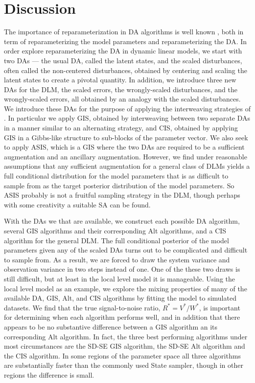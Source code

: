 \documentclass[12pt]{article}
\begin{document}
\section{Discussion}\label{sec:Discuss}

The importance of reparameterization in DA algorithms is well known \citep{papaspiliopoulos2007general}, both in term of reparameterizing the model parameters and reparameterizing the DA. In order explore reparameterizing the DA in dynamic linear models, we start with two DAs --- the usual DA, called the latent states, and the scaled disturbances, often called the non-centered disturbances, obtained by centering and scaling the latent states to create a pivotal quantity. In addition, we introduce three new DAs for the DLM, the scaled errors, the wrongly-scaled disturbances, and the wrongly-scaled errors, all obtained by an analogy with the scaled disturbances. We introduce these DAs for the purpose of applying the interweaving strategies of \citet{yu2011center}. In particular we apply GIS, obtained by interweaving between two separate DAs in a manner similar to an alternating strategy, and CIS, obtained by applying GIS in a Gibbs-like structure to sub-blocks of the parameter vector. We also seek to apply ASIS, which is a GIS where the two DAs are required to be a sufficient augmentation and an ancillary augmentation. However, we find under reasonable assumptions that any sufficient augmentation for a general class of DLMs yields a full conditional distribution for the model parameters that is as difficult to sample from as the target posterior distribution of the model parameters. So ASIS probably is not a fruitful sampling strategy in the DLM, though perhaps with some creativity a suitable SA can be found.

With the DAs we that are available, we construct each possible DA algorithm, several GIS algorithms and their corresponding Alt algorithms, and a CIS algorithm for the general DLM. The full conditional posterior of the model parameters given any of the scaled DAs turns out to be complicated and difficult to sample from. As a result, we are forced to draw the system variance and observation variance in two steps instead of one. One of the these two draws is still difficult, but at least in the local level model it is manageable. Using the local level model as an example, we explore the mixing properties of many of the available DA, GIS, Alt, and CIS algorithms by fitting the model to simulated datasets. We find that the true signal-to-noise ratio, $R^*=V^*/W^*$, is important for determining when each algorithm performs well, and in addition that there appears to be no substantive difference between a GIS algorithm an its corresponding Alt algorithm. In fact, the three best performing algorithms under most circumstances are the SD-SE GIS algorithm, the SD-SE Alt algorithm and the CIS algorithm. In some regions of the parameter space all three algorithms are substantially faster than the commonly used State sampler, though in other regions the difference is small.
\end{document}
